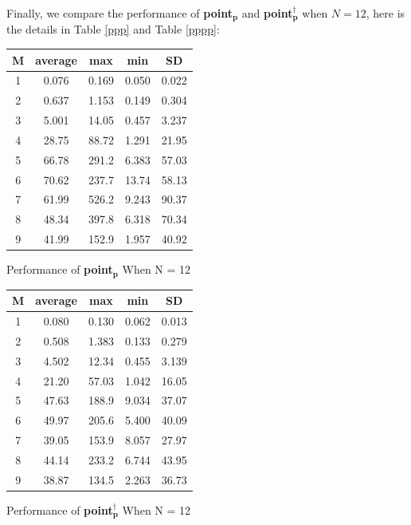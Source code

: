 \documentclass[twocolumn]{article}
\begin{document}
Finally, we compare the performance of \textbf{point$\bm{_p}$} and \textbf{point$\bm{_p^\dagger}$} when $N = 12$, here is the details in Table \ref{ppp} and Table \ref{pppp}:

\begin{center}
\makeatletter
\def\@captype{table}
\begin{tabular}{|c|c|c|c|c|}
\hline
M & average & max & min & SD \\
\hline
1 & 0.076 & 0.169 & 0.050 & 0.022 \\
\hline
2 & 0.637 & 1.153 & 0.149 & 0.304 \\
\hline
3 & 5.001 & 14.05 & 0.457 & 3.237 \\
\hline
4 & 28.75 & 88.72 & 1.291 & 21.95 \\
\hline
5 & 66.78 & 291.2 & 6.383 & 57.03 \\
\hline
6 & 70.62 & 237.7 & 13.74 & 58.13 \\
\hline
7 & 61.99 & 526.2 & 9.243 & 90.37 \\
\hline
8 & 48.34 & 397.8 & 6.318 & 70.34 \\
\hline
9 & 41.99 & 152.9 & 1.957 & 40.92 \\
\hline
\end{tabular}
\caption{Performance of \textbf{point$\bm{_p}$} When N = 12}
\label{ppp}
\end{center}

\begin{center}
\makeatletter
\def\@captype{table}
\begin{tabular}{|c|c|c|c|c|}
\hline
M & average & max & min & SD \\
\hline
1 & 0.080 & 0.130 & 0.062 & 0.013 \\
\hline
2 & 0.508 & 1.383 & 0.133 & 0.279 \\
\hline
3 & 4.502 & 12.34 & 0.455 & 3.139 \\
\hline
4 & 21.20 & 57.03 & 1.042 & 16.05 \\
\hline
5 & 47.63 & 188.9 & 9.034 & 37.07 \\
\hline
6 & 49.97 & 205.6 & 5.400 & 40.09 \\
\hline
7 & 39.05 & 153.9 & 8.057 & 27.97 \\
\hline
8 & 44.14 & 233.2 & 6.744 & 43.95 \\
\hline
9 & 38.87 & 134.5 & 2.263 & 36.73 \\
\hline
\end{tabular}
\caption{Performance of \textbf{point$\bm{_p^\dagger}$} When N = 12}
\label{pppp}
\end{center}
\end{document}
